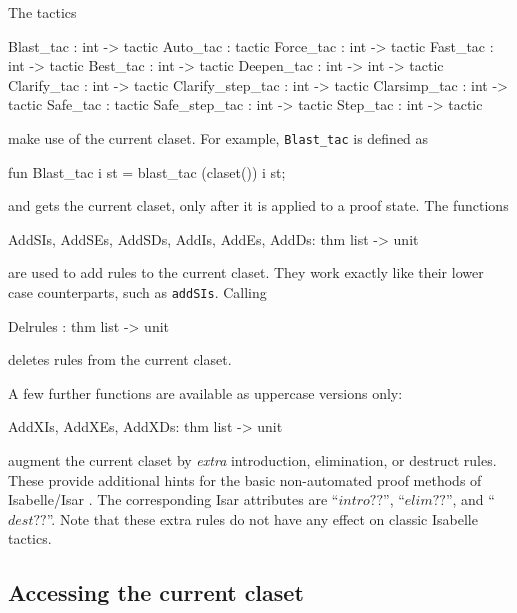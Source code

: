 The tactics
\begin{ttbox}
Blast_tac        : int -> tactic
Auto_tac         :        tactic
Force_tac        : int -> tactic
Fast_tac         : int -> tactic
Best_tac         : int -> tactic
Deepen_tac       : int -> int -> tactic
Clarify_tac      : int -> tactic
Clarify_step_tac : int -> tactic
Clarsimp_tac     : int -> tactic
Safe_tac         :        tactic
Safe_step_tac    : int -> tactic
Step_tac         : int -> tactic
\end{ttbox}
%
make use of the current claset.  For example, \texttt{Blast_tac} is defined as 
\begin{ttbox}
fun Blast_tac i st = blast_tac (claset()) i st;
\end{ttbox}
and gets the current claset, only after it is applied to a proof state.  
The functions
\begin{ttbox}
AddSIs, AddSEs, AddSDs, AddIs, AddEs, AddDs: thm list -> unit
\end{ttbox}
  
  
are used to add rules to the current claset.  They work exactly like their
lower case counterparts, such as \texttt{addSIs}.  Calling
\begin{ttbox}
Delrules : thm list -> unit
\end{ttbox}
deletes rules from the current claset. 

\medskip A few further functions are available as uppercase versions only:
\begin{ttbox}
AddXIs, AddXEs, AddXDs: thm list -> unit
\end{ttbox}
   augment the
current claset by \emph{extra} introduction, elimination, or destruct rules.
These provide additional hints for the basic non-automated proof methods of
Isabelle/Isar \cite{isabelle-isar-ref}.  The corresponding Isar attributes are
``$intro??$'', ``$elim??$'', and ``$dest??$''.  Note that these extra rules do
not have any effect on classic Isabelle tactics.


\subsection{Accessing the current claset}
\label{sec:access-current-claset}

